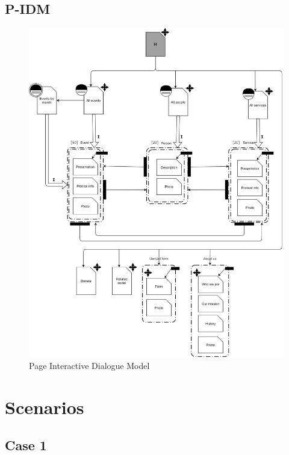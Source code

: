 \documentclass[11pt, a4paperm, hidelinks]{article}
\begin{document}
	\subsection{P-IDM}
	\begin{figure}[h!]
		\centering
		\begin{minipage}[b]{1\textwidth}
    			\includegraphics[width=\textwidth]{./assets/P-IDM.png}
			\caption{Page Interactive Dialogue Model}
		\end{minipage}
	\end{figure}
	\clearpage


	\section{Scenarios}

	\subsection{Case 1}
	
\clearpage
\end{document}
